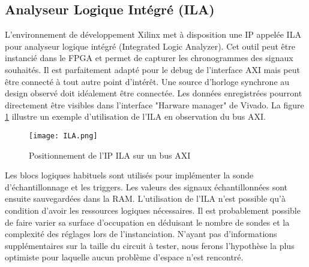 \subsection{Analyseur Logique Intégré (ILA)}
L'environnement de développement Xilinx met à disposition une IP appelée ILA pour analyseur logique intégré (Integrated Logic Analyzer).
Cet outil peut être instancié dans le FPGA et permet de capturer les chronogrammes des signaux souhaités.
Il est parfaitement adapté pour le debug de l'interface AXI mais peut être connecté à tout autre point d'intérêt.
Une source d'horloge synchrone au design observé doit idéalement être connectée. \cite{ILA_doc}
Les données enregistrées pourront directement être visibles dans l'interface "Harware manager" de Vivado.
La figure \ref{fig:ILA} illustre un exemple d'utilisation de l'ILA en observation du bus AXI.
\begin{figure}[H]
    \centering
    \texttt{[image: ILA.png]}
    \caption{Positionnement de l'IP ILA sur un bus AXI}
    \label{fig:ILA}
\end{figure}
Les blocs logiques habituels sont utilisés pour implémenter la sonde d'échantillonnage et les triggers.
Les valeurs des signaux échantillonnées sont ensuite sauvegardées dans la RAM.
L'utilisation de l'ILA n'est possible qu'à condition d'avoir les ressources logiques nécessaires.
Il est probablement possible de faire varier sa surface d'occupation en déduisant le nombre de sondes et la complexité des réglages lors de l'instanciation.
N'ayant pas d'informations supplémentaires sur la taille du circuit à tester, nous ferons l'hypothèse la plus optimiste pour laquelle aucun problème d'espace n'est rencontré.
